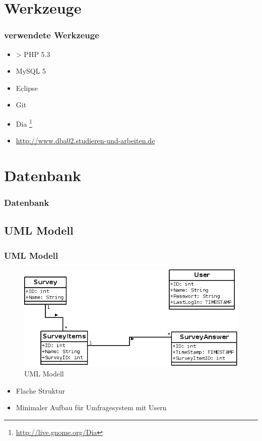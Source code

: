 \documentclass[xcolor=dvipsnames]{beamer}
\begin{document}
\section{Werkzeuge}
\begin{frame} %
  \frametitle{verwendete Werkzeuge} %
  \begin{block}{}
	  \begin{itemize}
  		\item > PHP 5.3
		\item MySQL 5
  		\item Eclipse
  		\item Git
  		\item Dia \footnote{\url{http://live.gnome.org/Dia}}
  		\item \url{http://www.dba02.studieren-und-arbeiten.de}
	  \end{itemize}
  \end{block}  
\end{frame}


\section{Datenbank}
\begin{frame} %
  \frametitle{Datenbank} %
\end{frame}


\subsection{UML Modell}
\begin{frame} %
  \frametitle{UML Modell} %
  	\begin{figure}
	   \includegraphics[scale=0.4]{database.png}
		\caption{UML Modell}
	\end{figure}
	\begin{block}{}		
	\begin{itemize}[]
		\item Flache Struktur
		\item Minimaler Aufbau für Umfragesystem mit Usern
	\end{itemize}
\end{block}\end{frame}
\end{document}

